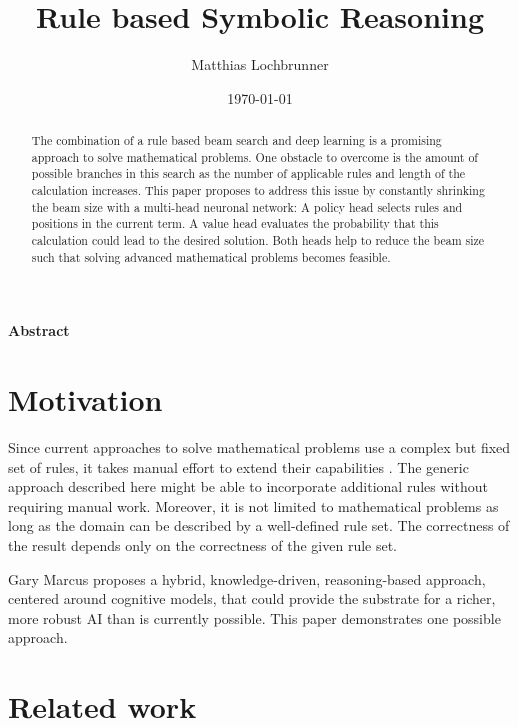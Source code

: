 \documentclass{scrartcl}
\title{Rule based Symbolic Reasoning}
\author{Matthias Lochbrunner}
\date{\today}
\theoremstyle{definition}
\begin{document}
\maketitle
\begin{center}
	\textbf{Abstract}
\end{center}
\begin{abstract}
	The combination of a rule based beam search and deep learning is a promising approach to solve mathematical problems.
	One obstacle to overcome is the amount of possible branches in this search as the number of applicable rules and length of the calculation increases.
	This paper proposes to address this issue by constantly shrinking the beam size with a multi-head neuronal network:
	A policy head selects rules and positions in the current term.
	A value head evaluates the probability that this calculation could lead to the desired solution.
	Both heads help to reduce the beam size such that solving advanced mathematical problems becomes feasible.
\end{abstract}

\section{Motivation}

Since current approaches to solve mathematical problems use a complex but fixed set of rules, it takes manual effort to extend their capabilities \cite{wolfram}.
The generic approach described here might be able to incorporate additional rules without requiring manual work.
Moreover, it is not limited to mathematical problems as long as the domain can be described by a well-defined rule set.
The correctness of the result depends only on the correctness of the given rule set.

Gary Marcus proposes a hybrid, knowledge-driven, reasoning-based approach, centered around cognitive models,
that could provide the substrate for a richer, more robust AI than is currently possible. \cite{marcus2020decade}
This paper demonstrates one possible approach.

\section{Related work}
\end{document}

